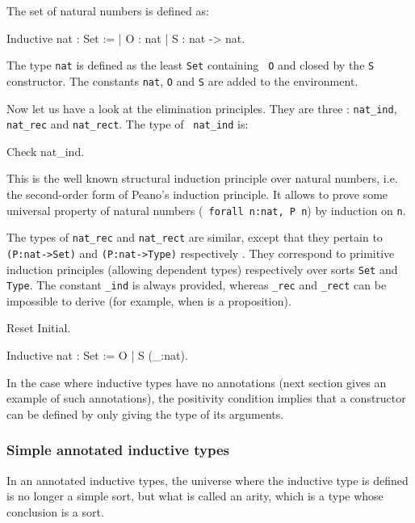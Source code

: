 The set of natural numbers is defined as:
\begin{coq_example}
Inductive nat : Set :=
  | O : nat
  | S : nat -> nat.
\end{coq_example}

The type {\tt nat} is defined as the least \verb:Set: containing {\tt
  O} and closed by the {\tt S} constructor. The constants {\tt nat},
{\tt O} and {\tt S} are added to the environment.

Now let us have a look at the elimination principles. They are three :
{\tt nat\_ind}, {\tt nat\_rec} and {\tt nat\_rect}.  The type of {\tt
  nat\_ind} is:
\begin{coq_example}
Check nat_ind.
\end{coq_example}

This is the well known structural induction principle over natural
numbers, i.e. the second-order form of Peano's induction principle.
It allows to prove some universal property of natural numbers ({\tt
forall n:nat, P n}) by induction on {\tt n}.

The types of {\tt nat\_rec} and {\tt nat\_rect} are similar, except
that they pertain to {\tt (P:nat->Set)} and {\tt (P:nat->Type)}
respectively . They correspond to primitive induction principles
(allowing dependent types) respectively over sorts \verb:Set: and
\verb:Type:. The constant {\ident}{\tt \_ind} is always provided,
whereas {\ident}{\tt \_rec} and {\ident}{\tt \_rect} can be impossible
to derive (for example, when {\ident} is a proposition).

\begin{coq_eval}
Reset Initial.
\end{coq_eval}
\begin{Variants}
\item 
\begin{coq_example*}
Inductive nat : Set := O | S (_:nat).
\end{coq_example*}
In the case where inductive types have no annotations (next section
gives an example of such annotations), the positivity condition
implies that a constructor can be defined by only giving the type of
its arguments.
\end{Variants}

\subsubsection{Simple annotated inductive types}

In an annotated inductive types, the universe where the inductive
type is defined is no longer a simple sort, but what is called an
arity, which is a type whose conclusion is a sort.


